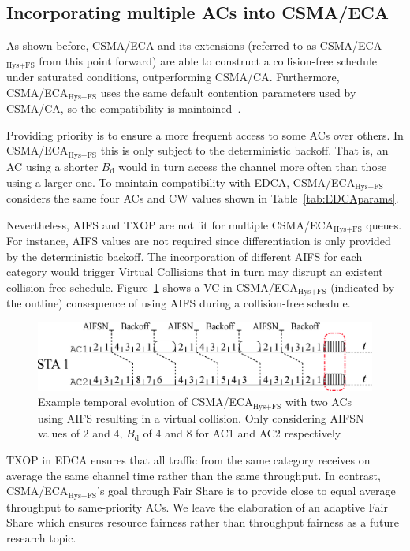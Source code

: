 \subsection{Incorporating multiple ACs into CSMA/ECA}
As shown before, CSMA/ECA and its extensions (referred to as CSMA/ECA$_{\text{Hys+FS}}$ from this point forward) are able to construct a collision-free schedule under saturated conditions, outperforming CSMA/CA. Furthermore, CSMA/ECA$_{\text{Hys+FS}}$ uses the same default contention parameters used by CSMA/CA, so the compatibility is maintained~\cite{sanabria2014high}.

Providing priority is to ensure a more frequent access to some ACs over others. In CSMA/ECA$_{\text{Hys+FS}}$ this is only subject to the deterministic backoff. That is, an AC using a shorter $B_{\text{d}}$ would in turn access the channel more often than those using a larger one. To maintain compatibility with EDCA, CSMA/ECA$_{\text{Hys+FS}}$ considers the same four ACs and CW values shown in Table~\ref{tab:EDCAparams}. 

Nevertheless, AIFS and TXOP are not fit for multiple CSMA/ECA$_{\text{Hys+FS}}$ queues. For instance, AIFS values are not required since differentiation is only provided by the deterministic backoff. The incorporation of different AIFS for each category would trigger Virtual Collisions that in turn may disrupt an existent collision-free schedule. Figure~\ref{fig:AIFSinECA} shows a VC in CSMA/ECA$_{\text{Hys+FS}}$ (indicated by the outline) consequence of using AIFS during a collision-free schedule.

	\begin{figure}[tb]
	\centering
		\includegraphics[width=\linewidth]{figures/AIFSwithECA.eps}
		\caption{Example temporal evolution of CSMA/ECA$_{\text{Hys+FS}}$ with two ACs using AIFS resulting in a virtual collision. Only considering AIFSN values of 2 and 4, $B_{\text{d}}$ of 4 and 8 for AC1 and AC2 respectively}
		\label{fig:AIFSinECA}
	\end{figure}


TXOP in EDCA ensures that all traffic from the same category receives on average the same channel time rather than the same throughput. In contrast, CSMA/ECA$_{\text{Hys+FS}}$'s goal through Fair Share is to provide close to equal average throughput to same-priority ACs. We leave the elaboration of an adaptive Fair Share which ensures resource fairness rather than throughput fairness as a future research topic.


